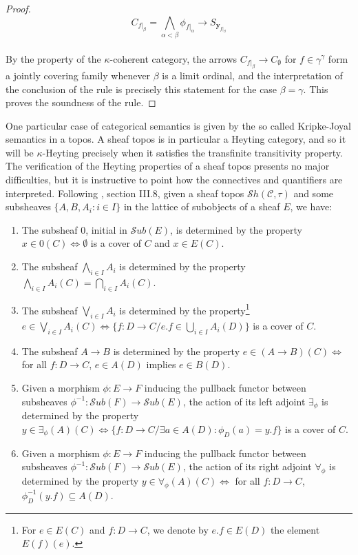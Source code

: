 \documentclass[a4paper,11pt]{article}
\theoremstyle{plain}
\theoremstyle{plain}
\theoremstyle{remark}
\begin{document}
\begin{proof}
 $$C_{f|_{\beta}}=\bigwedge_{\alpha<\beta}\phi_{f|_{\alpha}} \to S_{\mathbf{y}_{f|_{\beta}}}$$
 \\
 
 By the property of the $\kappa$-coherent category, the arrows $C_{f|_{\beta}} \to C_{\emptyset}$ for $f \in \gamma^{\gamma}$ form a jointly covering family whenever $\beta$ is a limit ordinal, and the interpretation of the conclusion of the rule is precisely this statement for the case $\beta=\gamma$. This proves the soundness of the rule.
\end{proof}

One particular case of categorical semantics is given by the so called Kripke-Joyal semantics in a topos. A sheaf topos is in particular a Heyting category, and so it will be $\kappa$-Heyting precisely when it satisfies the transfinite transitivity property. The verification of the Heyting properties of a sheaf topos presents no major difficulties, but it is instructive to point how the connectives and quantifiers are interpreted. Following \cite{maclane-moerdijk}, section III.8, given a sheaf topos $\mathcal{S}h(\mathcal{C}, \tau)$ and some subsheaves $\{A, B, A_i: i \in I\}$ in the lattice of subobjects of a sheaf $E$, we have:

\begin{enumerate}
 \item The subsheaf $0$, initial in $\mathcal{S}ub(E)$, is determined by the property $x \in 0(C) \Leftrightarrow \emptyset$ is a cover of $C$ and $x \in E(C)$.
 \item The subsheaf $\bigwedge_{i \in I} A_i$ is determined by the property $\bigwedge_{i \in I} A_i(C)= \bigcap_{i \in I} A_i(C)$.
 \item The subsheaf $\bigvee_{i \in I} A_i$ is determined by the property\footnote{For $e \in E(C)$ and $f: D \to C$, we denote by $e.f \in E(D)$ the element $E(f)(e)$.} $e \in \bigvee_{i \in I} A_i(C) \Leftrightarrow \{f: D \to C/e.f \in \bigcup_{i \in I}A_i(D)\}$ is a cover of $C$.
 \item The subsheaf $A \rightarrow B$ is determined by the property $e \in (A \rightarrow B)(C) \Leftrightarrow$ for all $f: D \to C$, $e \in A(D)$ implies $e \in B(D)$.
 \item Given a morphism $\phi: E \to F$ inducing the pullback functor between subsheaves $\phi^{-1}: \mathcal{S}ub(F) \to \mathcal{S}ub(E)$, the action of its left adjoint $\exists_{\phi}$ is determined by the property $y \in \exists_{\phi}(A)(C) \Leftrightarrow \{f: D \to C/\exists a \in A(D): \phi_D(a)=y.f\}$ is a cover of $C$.
 \item Given a morphism $\phi: E \to F$ inducing the pullback functor between subsheaves $\phi^{-1}: \mathcal{S}ub(F) \to \mathcal{S}ub(E)$, the action of its right adjoint $\forall_{\phi}$ is determined by the property $y \in \forall_{\phi}(A)(C) \Leftrightarrow$ for all $f: D \to C$, $\phi_D^{-1}(y.f) \subseteq A(D)$.
\end{enumerate}
\end{document}
